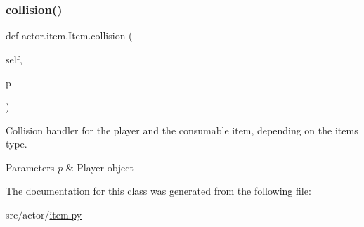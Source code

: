 \subsubsection{\texorpdfstring{collision()}{collision()}}
{\footnotesize\ttfamily def actor.\+item.\+Item.\+collision (\begin{DoxyParamCaption}\item[{}]{self,  }\item[{}]{p }\end{DoxyParamCaption})}



Collision handler for the player and the consumable item, depending on the item\textquotesingle{}s type. 


\begin{DoxyParams}{Parameters}
{\em p} & Player object \\
\hline
\end{DoxyParams}


The documentation for this class was generated from the following file\+:\begin{DoxyCompactItemize}
\item 
src/actor/\hyperlink{item_8py}{item.\+py}\end{DoxyCompactItemize}
